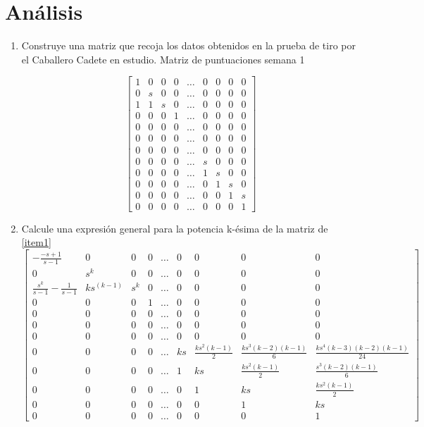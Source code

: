 \documentclass[12pt,a4paper]{article}
\begin{document}
\section{Análisis}
\begin{enumerate}
	\item \label{item1} Construye una matriz que recoja los datos obtenidos en la prueba de tiro por el Caballero Cadete en estudio.
		Matriz de puntuaciones semana 1


$$\begin{bmatrix}
	1	&	0	&	0	&	0	&	\ldots   &	0	&	0	&	0	&	0\\
	0	&	s	&	0	&	0	&   \ldots   &	0	&	0	&	0	&	0\\
	1	&	1	&	s	&	0	&	\ldots   &	0	&	0	&	0	&	0\\
	0	&	0	&	0	&	1	&	\ldots   &	0	&	0	&	0	&	0\\
	0	&	0	&	0	&	0	&	\ldots 	 &	0	&	0	&	0	&	0\\
	0	&	0	&	0	&	0	&	\ldots	&	0	&	0	&	0	&	0\\
	0	&	0	&	0	&	0	&	\ldots	&	0	&	0	&	0	&	0\\
	0	&	0	&	0	&	0	&	\ldots	&	s	&	0	&	0	&	0\\
	0	&	0	&	0	&	0	&	\ldots	&	1	&	s	&	0	&	0\\
	0	&	0	&	0	&	0	&	\ldots	&	0	&	1	&	s	&	0\\
	0	&	0	&	0	&	0	&	\ldots	&	0	&	0	&	1	&	s\\
	0	&	0	&	0	&	0	&	\ldots	&	0	&	0	&	0	&	1
\end{bmatrix}$$
	
	\item Calcule una expresión general para la potencia k-ésima de la matriz de \ref{item1}
	$$	
	\begin{bmatrix}
	-\frac{-s+1}{s-1}	&	0	&	0	&	0	&	\ldots	&	0	&	0	&	0	&	0\\
	0	&	s^{k}	&	0	&	0	&	\ldots	&	0	&	0	&	0	&	0\\
	\frac{s^{k}}{s-1} - \frac{1}{s-1}	&	ks^{(k - 1)}	&	s^{k}	&	0	&	\ldots	&	0	&	0	&	0	&	0\\
	0	&	0	&	0	&	1	&	\ldots	&	0	&	0	&	0	&	0\\
	0	&	0	&	0	&	0	&	\ldots	&	0	&	0	&	0	&	0\\
	0	&	0	&	0	&	0	&	\ldots	&	0	&	0	&	0	&	0\\
	0	&	0	&	0	&	0	&	\ldots	&	0	&	0	&	0	&	0\\
	0	&	0	&	0	&	0	&	\ldots	&	ks	&	\frac{ks^{2}(k - 1)}{2}	&	\frac{ks^{3}(k - 2)(k - 1)}{6}	&	\frac{ks^{4}(k - 3)(k - 2)(k - 1)}{24}\\
	0	&	0	&	0	&	0	&	\ldots	&	1	&	ks	&	\frac{ks^{2}(k - 1)}{2}	&	\frac{s^{3}(k - 2)(k - 1)}{6}\\
	0	&	0	&	0	&	0	&	\ldots	&	0	&	1	&	ks	&	\frac{ks^{2}(k - 1)}{2}\\
	0	&	0	&	0	&	0	&	\ldots	&	0	&	0	&	1	&	ks\\
	0	&	0	&	0	&	0	&	\ldots	&	0	&	0	&	0	&	1	
	\end{bmatrix}		
	$$
	

\end{enumerate}
\end{document}
